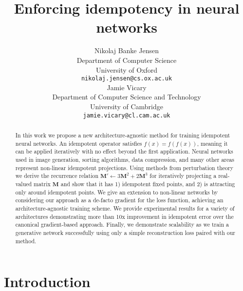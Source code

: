 \documentclass{article}
\title{Enforcing idempotency in neural networks}
\author{%
  Nikolaj Banke Jensen \\ %
  Department of Computer Science\\
  University of Oxford\\
  \texttt{nikolaj.jensen@cs.ox.ac.uk} \\
  \And
  Jamie Vicary \\
  Department of Computer Science and Technology \\
  University of Cambridge \\
  \texttt{jamie.vicary@cl.cam.ac.uk} \\
}
\newcommand{\vM}{\mathbf{M}}
\begin{document}
\maketitle


\begin{abstract}
  In this work we propose a new architecture-agnostic method for training idempotent neural networks. An idempotent operator satisfies $f(x) = f(f(x))$, meaning it can be applied iteratively with no effect beyond the first application. Neural networks used in image generation, sorting algorithms, data compression, and many other areas represent non-linear idempotent projections. Using methods from perturbation theory we derive the recurrence relation ${\vM' \leftarrow 3\vM^2 + 2\vM^3}$ for iteratively projecting a real-valued matrix $\vM$ and show that it has 1) idempotent fixed points, and 2) is attracting only around idempotent points. We give an extension to non-linear networks by considering our approach as a de-facto gradient for the loss function, achieving an architecture-agnostic training scheme. We provide experimental results for a variety of architectures demonstrating more than 10x improvement in idempotent error over the canonical gradient-based approach. Finally, we demonstrate scalability as we train a generative network successfully using only a simple reconstruction loss paired with our method.
\end{abstract}

\section{Introduction}
\label{sec:intro}
\end{document}
